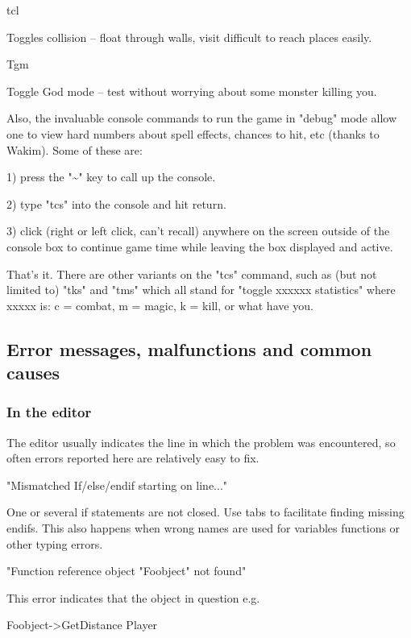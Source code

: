\documentclass[
]{article}
\begin{document}
tcl

Toggles collision -- float through walls, visit difficult to reach
places easily.

Tgm

Toggle God mode -- test without worrying about some monster killing you.

Also, the invaluable console commands to run the game in "debug" mode
allow one to view hard numbers about spell effects, chances to hit, etc
(thanks to Wakim). Some of these are:

1) press the "\textasciitilde" key to call up the console.

2) type "tcs" into the console and hit return.

3) click (right or left click, can't recall) anywhere on the screen
outside of the console box to continue game time while leaving the box
displayed and active.

That's it. There are other variants on the "tcs" command, such as (but
not limited to) "tks" and "tms" which all stand for "toggle xxxxxx
statistics" where xxxxx is: c = combat, m = magic, k = kill, or what
have you.

\hypertarget{error-messages-malfunctions-and-common-causes}{%
\subsection{Error messages, malfunctions and common
causes}\label{error-messages-malfunctions-and-common-causes}}

\hypertarget{in-the-editor}{%
\subsubsection{In the editor}\label{in-the-editor}}

The editor usually indicates the line in which the problem was
encountered, so often errors reported here are relatively easy to fix.

"Mismatched If/else/endif starting on line..."

One or several if statements are not closed. Use tabs to facilitate
finding missing endifs. This also happens when wrong names are used for
variables functions or other typing errors.

"Function reference object "Foobject" not found"

This error indicates that the object in question e.g.

Foobject-\textgreater GetDistance Player
\end{document}
